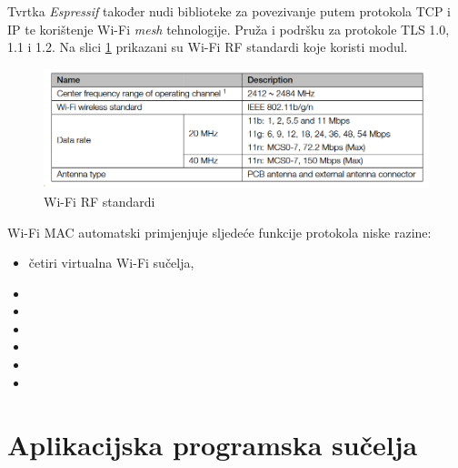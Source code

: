 Tvrtka \textit{Espressif} također nudi biblioteke za povezivanje putem protokola TCP i IP te korištenje Wi-Fi \textit{mesh} tehnologije. Pruža i podršku za protokole TLS 1.0, 1.1 i 1.2. Na slici \ref{fig:wifi_rf_table} prikazani su Wi-Fi RF standardi koje koristi modul. 

\begin{figure}[ht]
	\centering
	\includegraphics[scale=0.6]{imgs/wifi_rf_table}
	\caption{Wi-Fi RF standardi \cite{esp_mini}}
	\label{fig:wifi_rf_table}
\end{figure}

Wi-Fi MAC automatski primjenjuje sljedeće funkcije protokola niske razine:
\begin{itemize}
	\item četiri virtualna Wi-Fi sučelja,
	\item 
	\item 
	\item 
	\item 
	\item 
	\item 
\end{itemize}


\section{Aplikacijska programska sučelja}

 

\eject